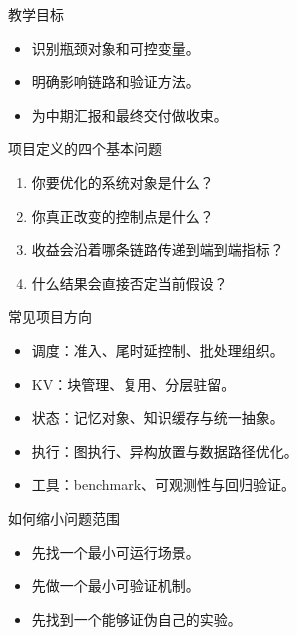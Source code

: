 




\begin{frame}[plain]
  \titlepage
\end{frame}

\begin{frame}{教学目标}
  \begin{itemize}
    \item 识别瓶颈对象和可控变量。
    \item 明确影响链路和验证方法。
    \item 为中期汇报和最终交付做收束。
  \end{itemize}
\end{frame}

\begin{frame}{项目定义的四个基本问题}
  \begin{enumerate}
    \item 你要优化的系统对象是什么？
    \item 你真正改变的控制点是什么？
    \item 收益会沿着哪条链路传递到端到端指标？
    \item 什么结果会直接否定当前假设？
  \end{enumerate}
\end{frame}

\begin{frame}{常见项目方向}
  \begin{itemize}
    \item 调度：准入、尾时延控制、批处理组织。
    \item KV：块管理、复用、分层驻留。
    \item 状态：记忆对象、知识缓存与统一抽象。
    \item 执行：图执行、异构放置与数据路径优化。
    \item 工具：benchmark、可观测性与回归验证。
  \end{itemize}
\end{frame}

\begin{frame}{如何缩小问题范围}
  \begin{itemize}
    \item 先找一个最小可运行场景。
    \item 先做一个最小可验证机制。
    \item 先找到一个能够证伪自己的实验。
  \end{itemize}
\end{frame}

